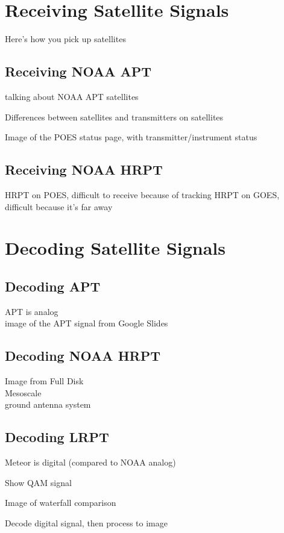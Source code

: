 \documentclass[]{beamer}
\begin{document}
\section[Reception]{Receiving Satellite Signals}
\begin{frame}
    Here's how you pick up satellites
\end{frame}
\subsection{Receiving NOAA APT}
\begin{frame}
    talking about NOAA APT satellites
\end{frame}
\begin{frame}
    Differences between satellites and transmitters on satellites
\end{frame}
\begin{frame}
    Image of the POES status page, with transmitter/instrument status
\end{frame}
\subsection{Receiving NOAA HRPT}
\begin{frame}
    HRPT on POES, difficult to receive because of tracking
    HRPT on GOES, difficult because it's far away
\end{frame}
\section[Decoding]{Decoding Satellite Signals}
\subsection{Decoding APT}
\begin{frame}
    APT is analog\\
    image of the APT signal from Google Slides
\end{frame}
\subsection{Decoding NOAA HRPT}
\begin{frame}
    Image from Full Disk\\
    Mesoscale\\
    ground antenna system
\end{frame}
\subsection{Decoding LRPT}
\begin{frame}
    Meteor is digital (compared to NOAA analog)
\end{frame}
\begin{frame}
    Show QAM signal
\end{frame}
\begin{frame}
    Image of waterfall comparison
\end{frame}
\begin{frame}
    Decode digital signal, then process to image
\end{frame}
\end{document}
